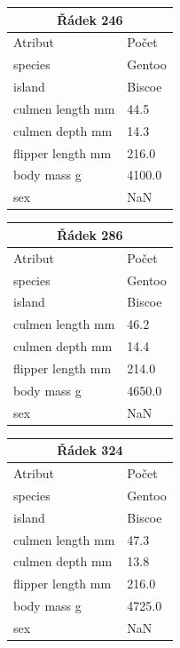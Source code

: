 \documentclass[10pt,xcolor=pdflatex,dvipsnames,table,oneside]{book}
\begin{document}
\begin{tabular}{|l|l|}
    \hline
    \multicolumn{2}{|c|}{Řádek 246} \\
    \hline
    \hline
    Atribut & Počet \\
    \hline
    \hline
    species           & Gentoo \\
    island            & Biscoe \\
    culmen length mm  &   44.5 \\
    culmen depth mm   &   14.3 \\
    flipper length mm &  216.0 \\
    body mass g       & 4100.0 \\
    sex               &    NaN \\
    \hline
\end{tabular}
\begin{tabular}{|l|l|}
    \hline
    \multicolumn{2}{|c|}{Řádek 286} \\
    \hline
    \hline
    Atribut & Počet \\
    \hline
    \hline
    species           & Gentoo \\
    island            & Biscoe \\
    culmen length mm  &   46.2 \\
    culmen depth mm   &   14.4 \\
    flipper length mm &  214.0 \\
    body mass g       & 4650.0 \\
    sex               &    NaN \\
    \hline
\end{tabular}
\begin{tabular}{|l|l|}
    \hline
    \multicolumn{2}{|c|}{Řádek 324} \\
    \hline
    \hline
    Atribut & Počet \\
    \hline
    \hline
    species           & Gentoo \\
    island            & Biscoe \\
    culmen length mm  &   47.3 \\
    culmen depth mm   &   13.8 \\
    flipper length mm &  216.0 \\
    body mass g       & 4725.0 \\
    sex               &    NaN \\
    \hline
\end{tabular}
\end{document}
